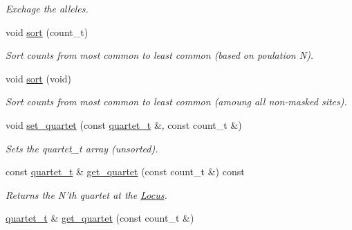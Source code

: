 \begin{DoxyCompactItemize}
\begin{DoxyCompactList}\small\item\em Exchage the alleles. \end{DoxyCompactList}\item 
\hypertarget{classLocus_a57060b5564af4de19b60a561e3c55d85}{void \hyperlink{classLocus_a57060b5564af4de19b60a561e3c55d85}{sort} (count\-\_\-t)}\label{classLocus_a57060b5564af4de19b60a561e3c55d85}

\begin{DoxyCompactList}\small\item\em Sort counts from most common to least common (based on poulation N). \end{DoxyCompactList}\item 
\hypertarget{classLocus_af2a9a5db3fac4c2ce7ad700eb5a9128e}{void \hyperlink{classLocus_af2a9a5db3fac4c2ce7ad700eb5a9128e}{sort} (void)}\label{classLocus_af2a9a5db3fac4c2ce7ad700eb5a9128e}

\begin{DoxyCompactList}\small\item\em Sort counts from most common to least common (amoung all non-\/masked sites). \end{DoxyCompactList}\item 
\hypertarget{classLocus_a5ac107da5d2f910bf168c92985ddbc44}{void \hyperlink{classLocus_a5ac107da5d2f910bf168c92985ddbc44}{set\-\_\-quartet} (const \hyperlink{structquartet}{quartet\-\_\-t} \&, const count\-\_\-t \&)}\label{classLocus_a5ac107da5d2f910bf168c92985ddbc44}

\begin{DoxyCompactList}\small\item\em Sets the quartet\-\_\-t array (unsorted). \end{DoxyCompactList}\item 
\hypertarget{classLocus_a55244bc358b4726242d678d17735726b}{const \hyperlink{structquartet}{quartet\-\_\-t} \& \hyperlink{classLocus_a55244bc358b4726242d678d17735726b}{get\-\_\-quartet} (const count\-\_\-t \&) const }\label{classLocus_a55244bc358b4726242d678d17735726b}

\begin{DoxyCompactList}\small\item\em Returns the N'th quartet at the \hyperlink{classLocus}{Locus}. \end{DoxyCompactList}\item 
\hypertarget{classLocus_a7f69001d4855521607141e0d61a4bea8}{\hyperlink{structquartet}{quartet\-\_\-t} \& \hyperlink{classLocus_a7f69001d4855521607141e0d61a4bea8}{get\-\_\-quartet} (const count\-\_\-t \&)}\label{classLocus_a7f69001d4855521607141e0d61a4bea8}


\end{DoxyCompactItemize}
